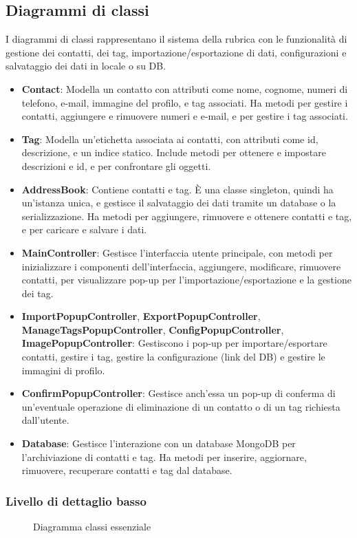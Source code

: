 \subsection{Diagrammi di classi}
I diagrammi di classi rappresentano il sistema della rubrica con le funzionalità di gestione dei contatti, dei tag, importazione/esportazione di dati, configurazioni e salvataggio dei dati in locale o su DB.
\begin{itemize}[noitemsep, topsep=5pt]
	\item \textbf{Contact}: Modella un contatto con attributi come nome, cognome, numeri di telefono, e-mail, immagine del profilo, e tag associati. Ha metodi per gestire i contatti, aggiungere e rimuovere numeri e e-mail, e per gestire i tag associati.
	\item \textbf{Tag}: Modella un'etichetta associata ai contatti, con attributi come id, descrizione, e un indice statico. Include metodi per ottenere e impostare descrizioni e id, e per confrontare gli oggetti.
	\item \textbf{AddressBook}: Contiene contatti e tag. È una classe singleton, quindi ha un'istanza unica, e gestisce il salvataggio dei dati tramite un database o la serializzazione. Ha metodi per aggiungere, rimuovere e ottenere contatti e tag, e per caricare e salvare i dati.
	\item \textbf{MainController}: Gestisce l'interfaccia utente principale, con metodi per inizializzare i componenti dell'interfaccia, aggiungere, modificare, rimuovere contatti, per visualizzare pop-up per l'importazione/esportazione e la gestione dei tag.
	\item \textbf{ImportPopupController}, \textbf{ExportPopupController}, \textbf{ManageTagsPopupController}, \textbf{ConfigPopupController}, \textbf{ImagePopupController}: Gestiscono i pop-up per importare/esportare contatti, gestire i tag, gestire la configurazione (link del DB) e gestire le immagini di profilo.
	\item \textbf{ConfirmPopupController}: Gestisce anch'essa un pop-up di conferma di un'eventuale operazione di eliminazione di un contatto o di un tag richiesta dall'utente.
	\item \textbf{Database}: Gestisce l'interazione con un database MongoDB per l'archiviazione di contatti e tag. Ha metodi per inserire, aggiornare, rimuovere, recuperare contatti e tag dal database.
\end{itemize}

\subsubsection{Livello di dettaglio basso}

\begin{figure}[h]
	\caption{Diagramma classi essenziale}
	\label{fig:Diagramma classi essenziale}
\end{figure}
\newpage
